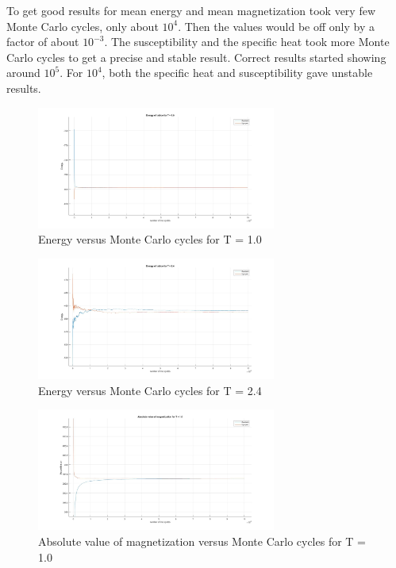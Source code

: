 \documentclass[10pt,a4paper]{article}
\begin{document}
\noindent To get good results for mean energy and mean magnetization took very few Monte Carlo cycles, only about $10^4$. Then the values would be off only by a factor of about $10^{-3}$. The susceptibility and the specific heat took more Monte Carlo cycles to get a precise and stable result. Correct results started showing around $10^{5}$. For $10^4$, both the specific heat and susceptibility gave unstable results.

\begin{figure}[H]
\centerline{
\includegraphics[width=0.7\textwidth]{energy1T}
}
\caption{Energy versus Monte Carlo cycles for T = 1.0}
\label{fig:energy1T}
\end{figure}

\begin{figure}[H]
\centerline{
\includegraphics[width=0.7\textwidth]{energy24T}
}
\caption{Energy versus Monte Carlo cycles for T = 2.4}
\label{fig:energy24T}
\end{figure}

\begin{figure}[H]
\centerline{
\includegraphics[width=0.7\textwidth]{absmag1T}
}
\caption{Absolute value of magnetization versus Monte Carlo cycles for T = 1.0}
\label{fig:absmag1T}
\end{figure}
\end{document}
